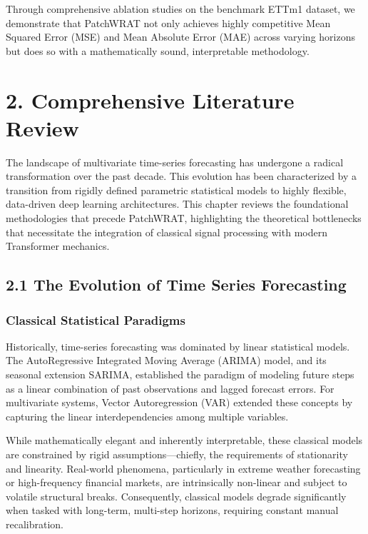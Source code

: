 \documentclass[11pt, letterpaper]{article}
\begin{document}
Through comprehensive ablation studies on the benchmark ETTm1 dataset, we demonstrate that PatchWRAT not only achieves highly competitive Mean Squared Error (MSE) and Mean Absolute Error (MAE) across varying horizons but does so with a mathematically sound, interpre\-table methodology.

\section{2. Comprehensive Literature Review}
\label{sec:lit_review}

The landscape of multivariate time-series forecasting has undergone a radical transformation over the past decade. This evolution has been characterized by a transition from rigidly defined parametric statistical models to highly flexible, data-driven deep learning architectures. This chapter reviews the foundational methodologies that precede PatchWRAT, highlighting the theoretical bottlenecks that necessitate the integration of classical signal processing with modern Transformer mechanics.

\subsection{2.1 The Evolution of Time Series Forecasting}

\subsubsection{Classical Statistical Paradigms}
Historically, time-series forecasting was dominated by linear statistical models. The AutoRegressive Integrated Moving Average (ARIMA) model, and its seasonal extension SARIMA, established the paradigm of modeling future steps as a linear combination of past observations and lagged forecast errors. For multivariate systems, Vector Autoregression (VAR) extended these concepts by capturing the linear interdependencies among multiple variables. 

While mathematically elegant and inherently interpretable, these classical models are constrained by rigid assumptions—chiefly, the requirements of stationarity and linearity. Real-world phenomena, particularly in extreme weather forecasting or high-frequency financial markets, are intrinsically non-linear and subject to volatile structural breaks. Consequently, classical models degrade significantly when tasked with long-term, multi-step horizons, requiring constant manual recalibration.
\end{document}
